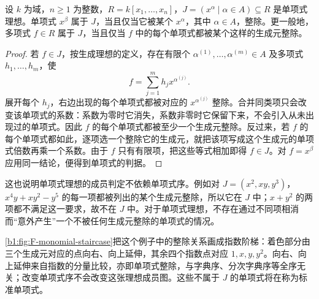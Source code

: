 \begin{proposition}\label{b1:prop:F-monomial-membership}
	设 \(k\) 为域，\(n\geq1\) 为整数，\(R=k[x_1,\ldots,x_n]\)，\(J=(x^\alpha\mid\alpha\in A)\subseteq R\) 是单项式理想。单项式 \(x^\beta\) 属于 \(J\)，当且仅当它被某个 \(x^\alpha\)，其中 \(\alpha\in A\)，整除。更一般地，多项式 \(f\in R\) 属于 \(J\)，当且仅当 \(f\) 中的每个单项式都被某个这样的生成元整除。
\end{proposition}
\begin{proof}
	若 \(f\in J\)，按生成理想的定义，存在有限个 \(\alpha^{(1)},\ldots,\alpha^{(m)}\in A\) 及多项式 \(h_1,\ldots,h_m\)，使
	\[
		f=\sum_{j=1}^m h_jx^{\alpha^{(j)}}.
	\]
	展开每个 \(h_j\)，右边出现的每个单项式都被对应的 \(x^{\alpha^{(j)}}\) 整除。合并同类项只会改变该单项式的系数：系数为零时它消失，系数非零时它保留下来，不会引入从未出现过的单项式。因此 \(f\) 的每个单项式都被至少一个生成元整除。反过来，若 \(f\) 的每个单项式都如此，逐项选一个整除它的生成元，就把该项写成这个生成元的单项式倍数再乘一个系数。由于 \(f\) 只有有限项，把这些等式相加即得 \(f\in J\)。对 \(f=x^\beta\) 应用同一结论，便得到单项式的判据。
\end{proof}

这也说明单项式理想的成员判定不依赖单项式序。例如对 \(J=(x^2,xy,y^3)\)，\(x^4y+xy^2-y^5\) 的每一项都被列出的某个生成元整除，所以它在 \(J\) 中；\(x+y^2\) 的两项都不满足这一要求，故不在 \(J\) 中。对于单项式理想，不存在通过不同项相消而“意外产生”一个不被任何生成元整除的单项式的情况。

\ProseParagraphBreak
\cref{b1:fig:F-monomial-staircase}把这个例子中的整除关系画成指数阶梯：着色部分由三个生成元对应的点向右、向上延伸，其余四个指数点对应 \(1,x,y,y^2\)。向右、向上延伸来自指数的分量比较，亦即单项式整除，与字典序、分次字典序等全序无关；改变单项式序不会改变这张理想成员图。这些不属于 \(J\) 的单项式将在称为标准单项式。

